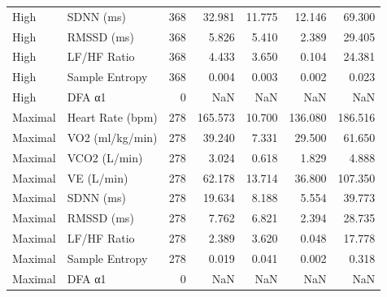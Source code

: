 \begin{table}[htbp]
\begin{tabular}{llrrrrr}
High & SDNN (ms) & 368 & 32.981 & 11.775 & 12.146 & 69.300 \\
High & RMSSD (ms) & 368 & 5.826 & 5.410 & 2.389 & 29.405 \\
High & LF/HF Ratio & 368 & 4.433 & 3.650 & 0.104 & 24.381 \\
High & Sample Entropy & 368 & 0.004 & 0.003 & 0.002 & 0.023 \\
High & DFA α1 & 0 & NaN & NaN & NaN & NaN \\
Maximal & Heart Rate (bpm) & 278 & 165.573 & 10.700 & 136.080 & 186.516 \\
Maximal & VO2 (ml/kg/min) & 278 & 39.240 & 7.331 & 29.500 & 61.650 \\
Maximal & VCO2 (L/min) & 278 & 3.024 & 0.618 & 1.829 & 4.888 \\
Maximal & VE (L/min) & 278 & 62.178 & 13.714 & 36.800 & 107.350 \\
Maximal & SDNN (ms) & 278 & 19.634 & 8.188 & 5.554 & 39.773 \\
Maximal & RMSSD (ms) & 278 & 7.762 & 6.821 & 2.394 & 28.735 \\
Maximal & LF/HF Ratio & 278 & 2.389 & 3.620 & 0.048 & 17.778 \\
Maximal & Sample Entropy & 278 & 0.019 & 0.041 & 0.002 & 0.318 \\
Maximal & DFA α1 & 0 & NaN & NaN & NaN & NaN \\
\bottomrule
\end{tabular}

\end{table}
